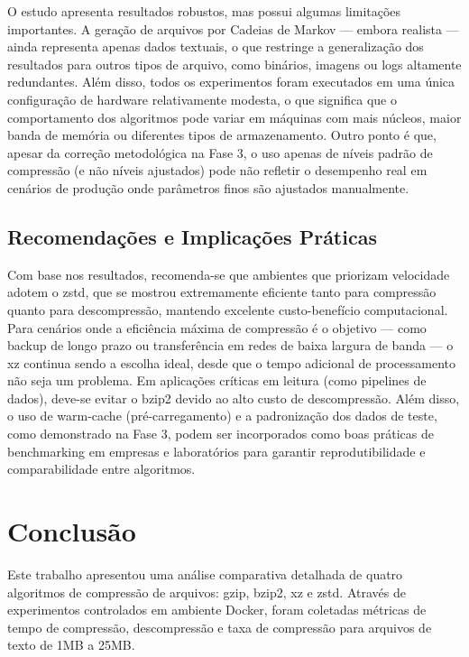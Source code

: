 \documentclass[acmsmall]{acmart}
\begin{document}
O estudo apresenta resultados robustos, mas possui algumas limitações importantes. A geração de arquivos por Cadeias de Markov --- embora realista --- ainda representa apenas dados textuais, o que restringe a generalização dos resultados para outros tipos de arquivo, como binários, imagens ou logs altamente redundantes. Além disso, todos os experimentos foram executados em uma única configuração de hardware relativamente modesta, o que significa que o comportamento dos algoritmos pode variar em máquinas com mais núcleos, maior banda de memória ou diferentes tipos de armazenamento. Outro ponto é que, apesar da correção metodológica na Fase 3, o uso apenas de níveis padrão de compressão (e não níveis ajustados) pode não refletir o desempenho real em cenários de produção onde parâmetros finos são ajustados manualmente.

\subsection{Recomendações e Implicações Práticas}

Com base nos resultados, recomenda-se que ambientes que priorizam velocidade adotem o zstd, que se mostrou extremamente eficiente tanto para compressão quanto para descompressão, mantendo excelente custo-benefício computacional. Para cenários onde a eficiência máxima de compressão é o objetivo --- como backup de longo prazo ou transferência em redes de baixa largura de banda --- o xz continua sendo a escolha ideal, desde que o tempo adicional de processamento não seja um problema. Em aplicações críticas em leitura (como pipelines de dados), deve-se evitar o bzip2 devido ao alto custo de descompressão. Além disso, o uso de warm-cache (pré-carregamento) e a padronização dos dados de teste, como demonstrado na Fase 3, podem ser incorporados como boas práticas de benchmarking em empresas e laboratórios para garantir reprodutibilidade e comparabilidade entre algoritmos.

\section{Conclusão}

Este trabalho apresentou uma análise comparativa detalhada de quatro algoritmos de compressão de arquivos: gzip, bzip2, xz e zstd. Através de experimentos controlados em ambiente Docker, foram coletadas métricas de tempo de compressão, descompressão e taxa de compressão para arquivos de texto de 1MB a 25MB.
\end{document}
